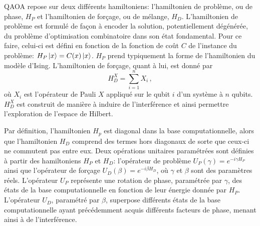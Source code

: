 QAOA repose sur deux différents hamiltoniens: l'hamiltonien de problème, ou de phase, $H_{P}$ et l'hamiltonien de forçage, ou de mélange, $H_{D}$. L'hamiltonien de problème est formulé de façon à encoder la solution, potentiellement dégénérée, du problème d'optimisation combinatoire dans son état fondamental. Pour ce faire, celui-ci est défini en fonction de la fonction de coût $C$ de l'instance du problème: $H_{P}\ket{x} = C(x)\ket{x}$. $H_{P}$ prend typiquement la forme de l'hamiltonien du modèle d'Ising. L'hamiltonien de forçage, quant à lui, est donné par
\begin{equation}
    \label{eq:x-drive}
    H_{D}^{X} = \sum_{i=1}^{n} X_{i} \,,
\end{equation}
où $X_{i}$ est l'opérateur de Pauli $X$ appliqué sur le qubit $i$ d'un système à $n$ qubits. $H_{D}^{X}$ est construit de manière à induire de l'interférence et ainsi permettre l'exploration de l'espace de Hilbert. 

Par définition, l'hamiltonien $H_{p}$ est diagonal dans la base computationnelle, alors que l'hamiltonien $H_{D}$ comprend des termes hors diagonaux de sorte que ceux-ci ne commutent pas entre eux. Deux opérations unitaires paramétrées sont définies à partir des hamiltoniens $H_{P}$ et $H_{D}$: l'opérateur de problème $U_{P}(\gamma) = e^{-i \gamma H_{P}}$ ainsi que l'opérateur de forçage $U_{D}(\beta) = e^{-i \beta H_{D}}$, où $\gamma$ et $\beta$ sont des paramètres réels. L'opérateur $U_{P}$ représente une rotation de phase, paramétrée par $\gamma$, des états de la base computationnelle en fonction de leur énergie donnée par $H_{P}$. L'opérateur $U_{D}$, paramétré par $\beta$, superpose différents états de la base computationnelle ayant précédemment acquis différents facteurs de phase, menant ainsi à de l'interférence.

